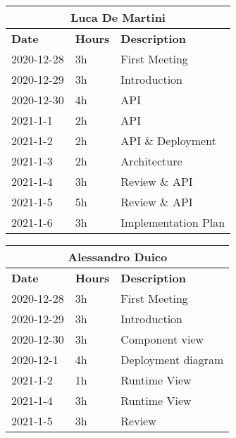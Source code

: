 
\begin{table}[H]
    \centering
    \begin{tabular}{|l|l|l|}
        \multicolumn{3}{c}{\textbf{Luca De Martini}}                   \\
        \hline
        \textbf{Date} & \textbf{Hours} & \textbf{Description}          \\\hline
        2020-12-28    & 3h             & First Meeting       \\\hline
        2020-12-29    & 3h             & Introduction       \\\hline
        2020-12-30    & 4h             & API       \\\hline
        2021-1-1    & 2h             & API       \\\hline
        2021-1-2    & 2h             & API \& Deployment       \\\hline
        2021-1-3    & 2h             & Architecture       \\\hline
        2021-1-4    & 3h             & Review \& API       \\\hline
        2021-1-5    & 5h             & Review \& API       \\\hline
        2021-1-6    & 3h             & Implementation Plan       \\\hline
    \end{tabular}
\end{table}
\begin{table}[H]
    \centering
    \begin{tabular}{|l|l|l|}
        \multicolumn{3}{c}{\textbf{Alessandro Duico}}                      \\
        \hline
        \textbf{Date} & \textbf{Hours} & \textbf{Description}              \\\hline
        2020-12-28    & 3h             & First Meeting           \\\hline
        2020-12-29    & 3h             & Introduction       \\\hline
        2020-12-30    & 3h             & Component view     \\\hline
        2020-12-1     & 4h             & Deployment diagram \\\hline
        2021-1-2     & 1h             & Runtime View   \\\hline
        2021-1-4     & 3h             & Runtime View   \\\hline
        2021-1-5     & 3h             & Review \\\hline
    \end{tabular}
\end{table}
